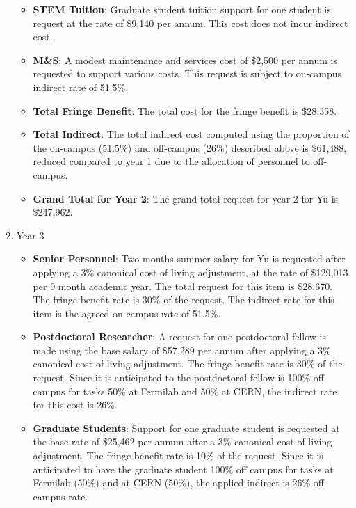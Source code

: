 \begin{enumerate}
\begin{itemize}[noitemsep,nolistsep]
\item {{\bf STEM Tuition}: Graduate student tuition support for one student is request at the rate of \$9,140 per annum.  This cost does not incur indirect cost.}

\item {{\bf M\&S}: A modest maintenance and services cost of \$2,500 per annum is requested to support various costs.   This request is subject to on-campus indirect rate of 51.5\%.}

\item {{\bf Total Fringe Benefit}: The total cost for the fringe benefit is \$28,358.}

\item {{\bf Total Indirect}: The total indirect cost computed using the proportion of the on-campus (51.5\%) and off-campus (26\%) described above is \$61,488, reduced compared to year 1 due to the allocation of personnel to off-campus.}

\item {{\bf Grand Total for Year 2}: The grand total request for year 2 for Yu is \$247,962.}

\end{itemize}

\item{Year 3}
\begin{itemize}[noitemsep,nolistsep]
\item{{\bf Senior Personnel}: Two months summer salary for Yu is requested after applying a 3\% canonical cost of living adjustment, at the rate of \$129,013 per 9 month academic year.  The total request for this item is \$28,670.   The fringe benefit rate is 30\% of the request.  The indirect rate for this item is the agreed on-campus rate of 51.5\%.}

\item {{\bf Postdoctoral Researcher}: A request for one postdoctoral fellow is made using the base salary of \$57,289 per annum after applying a 3\% canonical cost of living adjustment.  The fringe benefit rate is 30\% of the request.  Since it is anticipated to the postdoctoral fellow is 100\% off campus for tasks 50\% at Fermilab and 50\% at CERN, the indirect rate for this cost is 26\%.} 

\item{{\bf Graduate Students}: Support for one graduate student is requested at the base rate of \$25,462 per annum after a 3\% canonical cost of living adjustment.   The fringe benefit rate is 10\% of the request.  Since it is anticipated to have the graduate student 100\% off campus for tasks at Fermilab (50\%) and at CERN (50\%), the applied indirect is 26\% off-campus rate.}


\end{itemize}
\end{enumerate}
